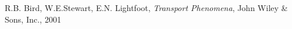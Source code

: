 \documentclass[10pt,twocolumn]{article}
\begin{document}
















\thebibliography{}

 R.B. Bird, W.E.Stewart, E.N. Lightfoot, \textit{Transport Phenomena}, John Wiley \& Sons, Inc., 2001
\end{document}
